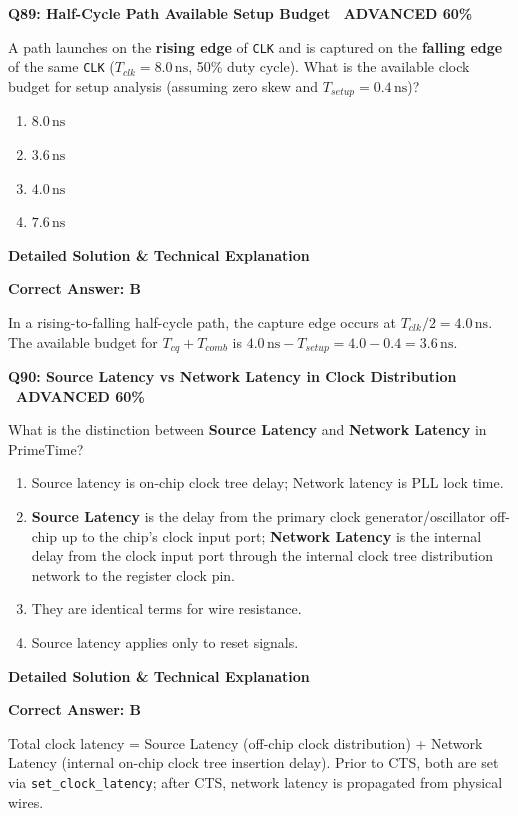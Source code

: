 \documentclass[11pt,a4paper]{article}
\newcommand{\badgeadv}{{\color{white}\colorbox{advred}{\bfseries\sffamily\tiny\ ADVANCED 60\%\ }}}
\newenvironment{qbox}[2]{%
  \begin{mdframed}[style=qstyle]%
  {\bfseries\sffamily\color{primaryblue}#1 \hfill #2}\par\vspace{2pt}%
}{%
  \end{mdframed}%
}
\newenvironment{ansbox}{%
  \begin{mdframed}[style=ansstyle]%
  {\bfseries\sffamily\color{ansgreen}\small Detailed Solution \& Technical Explanation}\par\vspace{2pt}\small%
}{%
  \end{mdframed}%
}
\begin{document}
\begin{qbox}{Q89: Half-Cycle Path Available Setup Budget}{\badgeadv}
A path launches on the \textbf{rising edge} of \texttt{CLK} and is captured on the \textbf{falling edge} of the same \texttt{CLK} ($T_{clk} = 8.0\,\text{ns}$, 50\% duty cycle).  
What is the available clock budget for setup analysis (assuming zero skew and $T_{setup} = 0.4\,\text{ns}$)?
\begin{enumerate}[label=\textbf{\Alph*.}]
  \item $8.0\,\text{ns}$
  \item $3.6\,\text{ns}$
  \item $4.0\,\text{ns}$
  \item $7.6\,\text{ns}$
\end{enumerate}
\end{qbox}
\begin{ansbox}
\textbf{Correct Answer: B}

In a rising-to-falling half-cycle path, the capture edge occurs at $T_{clk}/2 = 4.0\,\text{ns}$. The available budget for $T_{cq} + T_{comb}$ is $4.0\,\text{ns} - T_{setup} = 4.0 - 0.4 = 3.6\,\text{ns}$.
\end{ansbox}

\begin{qbox}{Q90: Source Latency vs Network Latency in Clock Distribution}{\badgeadv}
What is the distinction between \textbf{Source Latency} and \textbf{Network Latency} in PrimeTime?
\begin{enumerate}[label=\textbf{\Alph*.}]
  \item Source latency is on-chip clock tree delay; Network latency is PLL lock time.
  \item \textbf{Source Latency} is the delay from the primary clock generator/oscillator off-chip up to the chip's clock input port; \textbf{Network Latency} is the internal delay from the clock input port through the internal clock tree distribution network to the register clock pin.
  \item They are identical terms for wire resistance.
  \item Source latency applies only to reset signals.
\end{enumerate}
\end{qbox}
\begin{ansbox}
\textbf{Correct Answer: B}

Total clock latency = Source Latency (off-chip clock distribution) + Network Latency (internal on-chip clock tree insertion delay). Prior to CTS, both are set via \texttt{set\_clock\_latency}; after CTS, network latency is propagated from physical wires.
\end{ansbox}
\end{document}

